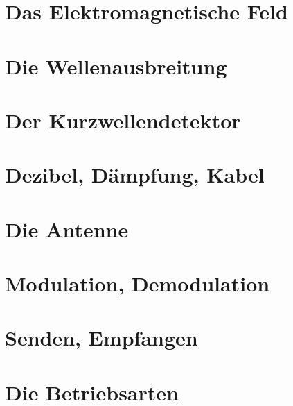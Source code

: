 \documentclass[ngerman, openany, twoside]{texdata/Script}
\begin{document}
\chapter{Das Elektromagnetische Feld}


\newpage \vspace*{5cm}
\newpage

\chapter{Die Wellenausbreitung}


\chapter{Der Kurzwellendetektor}


\chapter{Dezibel, Dämpfung, Kabel}


\newpage \vspace*{5cm}
\newpage

\chapter{Die Antenne}


\newpage \vspace*{5cm}
\newpage

\chapter{Modulation, Demodulation}


\newpage \vspace*{5cm}
\newpage

\chapter{Senden, Empfangen}


\newpage \vspace*{5cm}
\newpage

\chapter{Die Betriebsarten}

\end{document}
